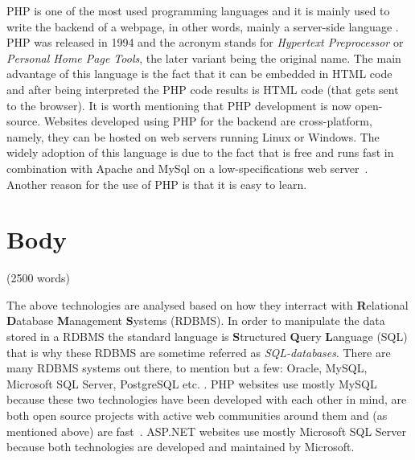 \documentclass[11]{article}
\begin{document}
	PHP is one of the most used programming languages \citep{cass2014top, cass20152015} and it is mainly used to write the backend of a webpage, in other words, mainly a server-side language . PHP was released in 1994 and the acronym stands for \textit{Hypertext Preprocessor}  or \textit{Personal Home Page Tools}, the later variant being the original name. The main advantage of this language is the fact that it can be embedded in HTML code and after being interpreted the PHP code results is HTML code (that gets sent to the browser). It is worth mentioning that PHP development is now open-source. Websites developed using PHP for the backend are cross-platform, namely, they can be hosted on web servers running Linux or Windows. The widely adoption of this language is due to the fact that is free and runs fast in combination with Apache and MySql on a low-specifications web server~\citep{converse2004php5}. Another reason for the use of PHP is that it is easy to learn.

\pagebreak

\section*{Body}(2500 words)

	The above technologies are analysed based on how they interract with \textbf{R}elational \textbf{D}atabase \textbf{M}anagement \textbf{S}ystems (RDBMS). In order to manipulate the data stored in a RDBMS the standard language is \textbf{S}tructured \textbf{Q}uery \textbf{L}anguage (SQL) that is why these RDBMS are sometime referred as \textit{SQL-databases}. There are many RDBMS systems out there, to mention but a few: Oracle, MySQL, Microsoft SQL Server, PostgreSQL etc. . PHP websites use mostly MySQL because these two technologies have been developed with each other in mind, are both open source projects with active web communities around them and (as mentioned above) are fast~\citep{davis2007learning}. ASP.NET websites use mostly Microsoft SQL Server because both technologies are developed and maintained by Microsoft. 

\end{document}
